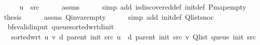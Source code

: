 \begin{isabellebody}
%
\endisadelimproof
%
\isatagproof
{}\isamarkupfalse%
\ {\isacharminus}{\kern0pt}\isanewline
\ \ \isamarkupfalse%
\ {\isachardoublequoteopen}u\ {\isacharequal}{\kern0pt}\ src{\isachardoublequoteclose}\isanewline
\ \ \ \ \isamarkupfalse%
\ assms{\isacharparenleft}{\kern0pt}{}{\isacharparenright}{\kern0pt}\isanewline
\ \ \ \ \isamarkupfalse%
\ {\isacharparenleft}{\kern0pt}simp\ add{\isacharcolon}{\kern0pt}\ is{\isacharunderscore}{\kern0pt}discovered{\isacharunderscore}{\kern0pt}def\ init{\isacharunderscore}{\kern0pt}def\ P{\isachardot}{\kern0pt}map{\isacharunderscore}{\kern0pt}empty{\isacharparenright}{\kern0pt}\isanewline
\ \ \isamarkupfalse%
\ {\isacharquery}{\kern0pt}thesis\isanewline
\ \ \ \ \isamarkupfalse%
\ assms{\isacharparenleft}{\kern0pt}{}{\isacharparenright}{\kern0pt}\ Q{\isachardot}{\kern0pt}invar{\isacharunderscore}{\kern0pt}empty\isanewline
\ \ \ \ \isamarkupfalse%
\ {\isacharparenleft}{\kern0pt}simp\ add{\isacharcolon}{\kern0pt}\ init{\isacharunderscore}{\kern0pt}def\ Q{\isachardot}{\kern0pt}list{\isacharunderscore}{\kern0pt}snoc{\isacharparenright}{\kern0pt}\isanewline
{}\isamarkupfalse%
%
\endisatagproof
{\isafoldproof}%
%
\isadelimproof
\isanewline
%
\endisadelimproof
%
\isadeliminvisible
\isanewline
%
\endisadeliminvisible
%
\isataginvisible
{}\isamarkupfalse%
\ {\isacharparenleft}{\kern0pt}\ bfs{\isacharunderscore}{\kern0pt}valid{\isacharunderscore}{\kern0pt}input{\isacharparenright}{\kern0pt}\ queue{\isacharunderscore}{\kern0pt}sorted{\isacharunderscore}{\kern0pt}wrt{\isacharunderscore}{\kern0pt}d{\isacharunderscore}{\kern0pt}init{\isacharcolon}{\kern0pt}\isanewline
\ \ \ {\isachardoublequoteopen}sorted{\isacharunderscore}{\kern0pt}wrt\ {\isacharparenleft}{\kern0pt}{\isasymlambda}u\ v{\isachardot}{\kern0pt}\ d\ {\isacharparenleft}{\kern0pt}parent\ {\isacharparenleft}{\kern0pt}init\ src{\isacharparenright}{\kern0pt}{\isacharparenright}{\kern0pt}\ u\ {\isasymle}\ d\ {\isacharparenleft}{\kern0pt}parent\ {\isacharparenleft}{\kern0pt}init\ src{\isacharparenright}{\kern0pt}{\isacharparenright}{\kern0pt}\ v{\isacharparenright}{\kern0pt}\ {\isacharparenleft}{\kern0pt}Q{\isacharunderscore}{\kern0pt}list\ {\isacharparenleft}{\kern0pt}queue\ {\isacharparenleft}{\kern0pt}init\ src{\isacharparenright}{\kern0pt}{\isacharparenright}{\kern0pt}{\isacharparenright}{\kern0pt}{\isachardoublequoteclose}%
\endisataginvisible
{\isafoldinvisible}%
%
\isadeliminvisible

\end{isabellebody}
